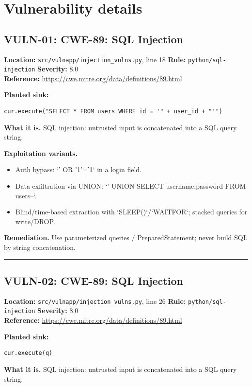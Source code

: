 \documentclass[11pt,a4paper]{article}
\begin{document}
\section{Vulnerability details}
\subsection{VULN-01: CWE-89: SQL Injection}
\noindent\textbf{Location:} \texttt{src/vulnapp/injection\_vulns.py}, line 18 \quad \textbf{Rule:} \texttt{python/sql-injection} \quad \textbf{Severity:} 8.0
\\ \textbf{Reference:} \url{https://cwe.mitre.org/data/definitions/89.html}

\noindent\textbf{Planted sink:}
\begin{lstlisting}
cur.execute("SELECT * FROM users WHERE id = '" + user_id + "'")
\end{lstlisting}
\noindent\textbf{What it is.} SQL injection: untrusted input is concatenated into a SQL query string.

\noindent\textbf{Exploitation variants.}
\begin{itemize}[leftmargin=1.4em,itemsep=1pt,topsep=2pt]
\item Auth bypass: `' OR '1'='1` in a login field.
\item Data exfiltration via UNION: `' UNION SELECT username,password FROM users--`.
\item Blind/time-based extraction with `SLEEP()`/`WAITFOR`; stacked queries for write/DROP.
\end{itemize}
\noindent\textbf{Remediation.} Use parameterized queries / PreparedStatement; never build SQL by string concatenation.

\vspace{4pt}\hrule\vspace{6pt}
\subsection{VULN-02: CWE-89: SQL Injection}
\noindent\textbf{Location:} \texttt{src/vulnapp/injection\_vulns.py}, line 26 \quad \textbf{Rule:} \texttt{python/sql-injection} \quad \textbf{Severity:} 8.0
\\ \textbf{Reference:} \url{https://cwe.mitre.org/data/definitions/89.html}

\noindent\textbf{Planted sink:}
\begin{lstlisting}
cur.execute(q)
\end{lstlisting}
\noindent\textbf{What it is.} SQL injection: untrusted input is concatenated into a SQL query string.
\end{document}
